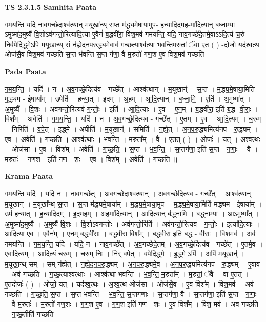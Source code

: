 \documentclass[17pt]{extarticle}
\begin{document}
\textbf{TS 2.3.1.5 } \newline
\textbf{Samhita Paata} \newline

गमयन्ति॒ यदि॒ नाव॒गच्छे॒दाश्व॑त्थान् म॒यूखा᳚न्थ् स॒प्त म॑द्ध्यमे॒षाया॒मुप॑- हन्यादि॒दम॒ह-मा॑दि॒त्यान् ब॑ध्ना॒म्या ऽमुष्मा॑द॒मुष्यै॑ वि॒शोऽव॑गन्तो॒रित्या॑दि॒त्या ए॒वैनं॑ ब॒द्धवी॑रा॒ विश॒मव॑ गमयन्ति॒ यदि॒ नाव॒गच्छे॑दे॒तमे॒वाऽऽदि॒त्यं च॒रुं निर्व॑पेदि॒द्ध्मेऽपि॑ म॒यूखा॒न्थ् सं न॑ह्येदनपरु॒द्ध्यमे॒वाव॑ गच्छ॒त्याश्व॑त्था भवन्तिम॒रुतां॒ ॅवा ए॒त ( ) -दोजो॒ यद॑श्व॒त्थ ओज॑सै॒व विश॒मव॑ गच्छति स॒प्त भ॑वन्ति स॒प्त ग॑णा॒ वै म॒रुतो॑ गण॒श ए॒व विश॒मव॑ गच्छति । \newline

\textbf{Pada Paata} \newline

ग॒म॒य॒न्ति॒ । यदि॑ । न । अ॒व॒गच्छे॒दित्य॑व - गच्छे᳚त् । आश्व॑त्थान् । म॒यूखान्॑ । स॒प्त । म॒द्ध्य॒मे॒षाया॒मिति॑ म॒द्ध्यम - ई॒षाया᳚म् । उपेति॑ । ह॒न्या॒त् । इ॒दम् । अ॒हम् । आ॒दि॒त्यान् । ब॒ध्ना॒मि॒ । एति॑ । अ॒मुष्मा᳚त् । अ॒मुष्यै᳚ । वि॒शः । अव॑गन्तो॒रित्यव॑-ग॒न्तोः॒ । इति॑ । आ॒दि॒त्याः । ए॒व । ए॒न॒म् । ब॒द्धवी॑रा॒ इति॑ ब॒द्ध -वी॒राः॒ । विश᳚म् । अवेति॑ । ग॒म॒य॒न्ति॒ । यदि॑ । न । अ॒व॒गच्छे॒दित्य॑व - गच्छे᳚त् । ए॒तम् । ए॒व । आ॒दि॒त्यम् । च॒रुम् । निरिति॑ । व॒पे॒त् । इ॒द्ध्मे । अपीति॑ । म॒यूखान्॑ । समिति॑ । न॒ह्ये॒त् । अ॒न॒प॒रु॒द्ध्यमित्य॑नप - रु॒द्ध्यम् । ए॒व । अवेति॑ । ग॒च्छ॒ति॒ । आश्व॑त्थाः । भ॒व॒न्ति॒ । म॒रुता᳚म् । वै । ए॒तत् ( ) । ओजः॑ । यत् । अ॒श्व॒त्थः । ओज॑सा । ए॒व । विश᳚म् । अवेति॑ । ग॒च्छ॒ति॒ । स॒प्त । भ॒व॒न्ति॒ । स॒प्तग॑णा॒ इति॑ स॒प्त - ग॒णाः॒ । वै । म॒रुतः॑ । ग॒ण॒श - इति॑ गण - शः । ए॒व । विश᳚म् । अवेति॑ । ग॒च्छ॒ति॒ ॥  \newline


\textbf{Krama Paata} \newline

ग॒म॒य॒न्ति॒ यदि॑ । यदि॒ न । नाव॒गच्छे᳚त् । अ॒व॒गच्छे॒दाश्व॑त्थान् । अ॒व॒गच्छे॒दित्य॑व - गच्छे᳚त् । आश्व॑त्थान् म॒यूखान्॑ । म॒यूखा᳚न्थ् स॒प्त । स॒प्त म॑द्ध्यमे॒षाया᳚म् । म॒द्ध्य॒मे॒षाया॒मुप॑ । म॒द्ध्य॒मे॒षाया॒मिति॑ मद्ध्यम - ई॒षाया᳚म् । उप॑ हन्यात् । ह॒न्या॒दि॒दम् । इ॒दम॒हम् । अ॒हमा॑दि॒त्यान् । आ॒दि॒त्यान् ब॑द्ध्नामि । ब॒द्ध्ना॒म्या । आऽमुष्मा᳚त् । अ॒मुष्मा॑द॒मुष्यै᳚ । अ॒मुष्यै॑ वि॒शः । वि॒शोऽव॑गन्तोः । अव॑गन्तो॒रिति॑ । अव॑गन्तो॒रित्यव॑ - ग॒न्तोः॒ । इत्या॑दि॒त्याः । आ॒दि॒त्या ए॒व । ए॒वैन᳚म् । ए॒न॒म् ब॒द्धवी॑राः । ब॒द्धवी॑रा॒ विश᳚म् । ब॒द्धवी॑रा॒ इति॑ ब॒द्ध - वी॒राः॒ । विश॒मव॑ । अव॑ गमयन्ति । ग॒म॒य॒न्ति॒ यदि॑ । यदि॒ न । नाव॒गच्छे᳚त् । अ॒व॒गच्छे॑दे॒तम् । अ॒व॒गच्छे॒दित्य॑व - गच्छे᳚त् । ए॒तमे॒व । ए॒वादि॒त्यम् । आ॒दि॒त्यं च॒रुम् । च॒रुम् निः । निर् व॑पेत् । व॒पे॒दि॒द्ध्मे । इ॒द्ध्मे ऽपि॑ । अपि॑ म॒यूखान्॑ । म॒यूखा॒न्थ् सम् । सम् न॑ह्येत् । न॒ह्ये॒द॒न॒प॒रु॒द्ध्यम् । अ॒न॒प॒रु॒द्ध्यमे॒व । अ॒न॒प॒रु॒द्ध्यमित्य॑नप - रु॒द्ध्यम् । ए॒वाव॑ । अव॑ गच्छति । ग॒च्छ॒त्याश्व॑त्थाः । आश्व॑त्था भवन्ति । भ॒व॒न्ति॒ म॒रुता᳚म् । म॒रुतां॒ ॅवै । वा ए॒तत् । ए॒तदोजः॑ ( ) । ओजो॒ यत् । यद॑श्व॒त्थः । अ॒श्व॒त्थ ओज॑सा । ओज॑सै॒व । ए॒व विश᳚म् । विश॒मव॑ । अव॑ गच्छति । ग॒च्छ॒ति॒ स॒प्त । स॒प्त भ॑वन्ति । भ॒व॒न्ति॒ स॒प्तग॑णाः । स॒प्तग॑णा॒ वै । स॒प्तग॑णा॒ इति॑ स॒प्त - ग॒णाः॒ । वै म॒रुतः॑ । म॒रुतो॑ गण॒शः । ग॒ण॒श ए॒व । ग॒ण॒श इति॑ गण - शः । ए॒व विश᳚म् । विश॒ मव॑ । अव॑ गच्छति । ग॒च्छ॒तीति॑ गच्छति । \newline
\end{document}
